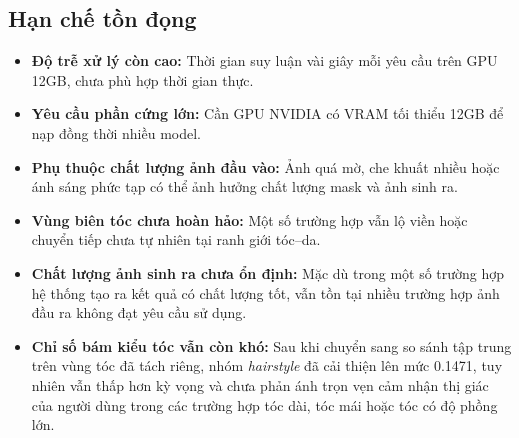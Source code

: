 \documentclass[../main.tex]{subfiles}
\begin{document}
\subsection{Hạn chế tồn đọng}
\begin{itemize}
    \item \textbf{Độ trễ xử lý còn cao:} Thời gian suy luận vài giây mỗi yêu cầu trên GPU 12GB, chưa phù hợp thời gian thực.
    \item \textbf{Yêu cầu phần cứng lớn:} Cần GPU NVIDIA có VRAM tối thiểu 12GB để nạp đồng thời nhiều model.
    \item \textbf{Phụ thuộc chất lượng ảnh đầu vào:} Ảnh quá mờ, che khuất nhiều hoặc ánh sáng phức tạp có thể ảnh hưởng chất lượng mask và ảnh sinh ra.
    \item \textbf{Vùng biên tóc chưa hoàn hảo:} Một số trường hợp vẫn lộ viền hoặc chuyển tiếp chưa tự nhiên tại ranh giới tóc--da.
    \item \textbf{Chất lượng ảnh sinh ra chưa ổn định:} Mặc dù trong một số trường hợp hệ thống tạo ra kết quả có chất lượng tốt, vẫn tồn tại nhiều trường hợp ảnh đầu ra không đạt yêu cầu sử dụng.
    \item \textbf{Chỉ số bám kiểu tóc vẫn còn khó:} Sau khi chuyển sang so sánh tập trung trên vùng tóc đã tách riêng, nhóm \textit{hairstyle} đã cải thiện lên mức 0.1471, tuy nhiên vẫn thấp hơn kỳ vọng và chưa phản ánh trọn vẹn cảm nhận thị giác của người dùng trong các trường hợp tóc dài, tóc mái hoặc tóc có độ phồng lớn.
\end{itemize}
\end{document}
